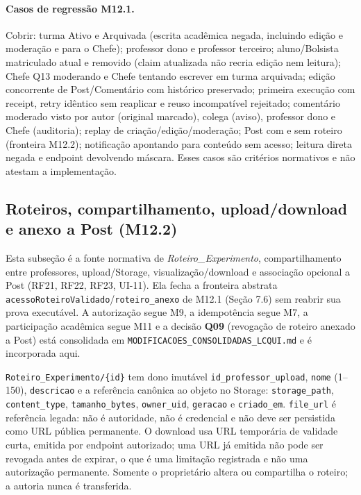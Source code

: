 \paragraph{Casos de regressão M12.1.}
Cobrir: turma Ativo e Arquivada (escrita acadêmica negada, incluindo edição e
moderação e para o Chefe); professor dono e professor terceiro; aluno/Bolsista
matriculado atual e removido (claim atualizada não recria edição nem leitura);
Chefe Q13 moderando e Chefe tentando escrever em turma arquivada; edição
concorrente de Post/Comentário com histórico preservado; primeira execução com
receipt, retry idêntico sem reaplicar e reuso incompatível rejeitado; comentário
moderado visto por autor (original marcado), colega (aviso), professor dono e
Chefe (auditoria); replay
de criação/edição/moderação; Post com e sem roteiro (fronteira M12.2);
notificação apontando para conteúdo sem acesso; leitura direta negada e
endpoint devolvendo máscara. Esses casos são critérios normativos e não atestam
a implementação.

\subsection{Roteiros, compartilhamento, upload/download e anexo a Post (M12.2)}
\label{sec:regras-roteiros-m12-2}

Esta subseção é a fonte normativa de \textit{Roteiro\_Experimento},
compartilhamento entre professores, upload/Storage, visualização/download e
associação opcional a Post (RF21, RF22, RF23, UI-11). Ela fecha a fronteira
abstrata \texttt{acessoRoteiroValidado}/\texttt{roteiro\_anexo} de M12.1 (Seção
7.6) sem reabrir sua prova executável. A autorização segue M9, a idempotência
segue M7, a participação acadêmica segue M11 e a decisão \textbf{Q09}
(revogação de roteiro anexado a Post) está consolidada em
\texttt{MODIFICACOES\_CONSOLIDADAS\_LCQUI.md} e é incorporada aqui.

\begin{regra}
\texttt{Roteiro\_Experimento/\{id\}} tem dono imutável
\texttt{id\_professor\_upload}, \texttt{nome} (1--150), \texttt{descricao} e a
referência canônica ao objeto no Storage: \texttt{storage\_path},
\texttt{content\_type}, \texttt{tamanho\_bytes}, \texttt{owner\_uid},
\texttt{geracao} e \texttt{criado\_em}. \texttt{file\_url} é referência legada:
não é autoridade, não é credencial e não deve ser persistida como URL pública
permanente. O download usa URL temporária de validade curta, emitida por
endpoint autorizado; uma URL já emitida não pode ser revogada antes de expirar,
o que é uma limitação registrada e não uma autorização permanente. Somente o
proprietário altera ou compartilha o roteiro; a autoria nunca é transferida.
\end{regra}

